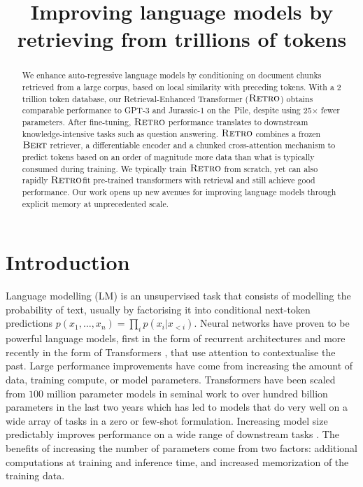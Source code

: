 \title{Improving language models by retrieving from trillions of tokens}

\begin{abstract}
We enhance auto-regressive language models by conditioning on document chunks retrieved from a large corpus, based on local similarity with preceding tokens. With a 2 trillion token database, our Retrieval-Enhanced Transformer ($\textsc{Retro}$) obtains comparable performance to GPT-3 and Jurassic-1 on the~Pile, despite using 25$\times$ fewer parameters. After fine-tuning, $\textsc{Retro}$ performance translates to downstream knowledge-intensive tasks such as question answering.
$\textsc{Retro}$ combines a frozen $\textsc{Bert}$ retriever, a differentiable encoder and a chunked cross-attention mechanism to predict tokens based on an order of magnitude more data than what is typically consumed during training. We typically train $\textsc{Retro}$ from scratch, yet can also rapidly $\textsc{Retro}$fit pre-trained transformers with retrieval and still achieve good performance. Our work opens up new avenues for improving language models through explicit memory at unprecedented scale.
\end{abstract}

\section{Introduction}
Language modelling (LM) is an unsupervised task that consists of modelling the probability of text, usually by factorising it into conditional next-token predictions $p(x_1, \dotsc, x_n) = \prod_i p(x_i | x_{<i})$. Neural networks have proven to be powerful language models, first in the form of recurrent architectures \citep{mikolov2010recurrent, graves2013generating, jozefowicz2016exploring} and more recently in the form of Transformers \citep{vaswani2017attention}, that use attention to contextualise the past. Large performance improvements have come from increasing the amount of data, training compute, or model parameters. Transformers have been scaled from $100$ million parameter models in seminal work to over hundred billion parameters \citep{radford2019language, brown2020language} in the last two years which has led to models that do very well on a wide array of tasks in a zero or few-shot formulation. Increasing model size predictably improves performance on a wide range of downstream tasks \citep{scaling_laws}. The benefits of increasing the number of parameters come from two factors: additional computations at training and inference time, and increased memorization of the training data.

